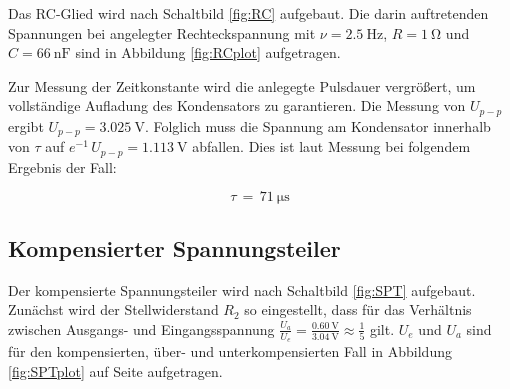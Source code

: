 \documentclass[10pt,a4paper]{scrartcl}
\begin{document}
Das RC-Glied wird nach Schaltbild \ref{fig:RC} aufgebaut.
Die darin auftretenden Spannungen bei angelegter Rechteckspannung mit
$\nu=2.5~\mathrm{Hz}$, $R=1~\mathrm{\Omega}$ und $C=66~\mathrm{nF}$
sind in Abbildung \ref{fig:RCplot} aufgetragen.

Zur Messung der Zeitkonstante wird die anlegegte Pulsdauer vergrößert,
um vollständige Aufladung des Kondensators zu garantieren.
Die Messung von $U_{p-p}$ ergibt $U_{p-p}=3.025~\mathrm V$.
Folglich muss die Spannung am Kondensator innerhalb von $\tau$ auf
$e^{-1}\,U_{p-p}=1.113~\mathrm V$ abfallen.
Dies ist laut Messung bei folgendem Ergebnis der Fall:

\begin{equation*}
    \boxed{\tau\,=\,71~\mathrm{\mu s}}
\end{equation*}

\subsection {Kompensierter Spannungsteiler}

Der kompensierte Spannungsteiler wird nach Schaltbild \ref{fig:SPT} aufgebaut.
Zunächst wird der Stellwiderstand $R_2$ so eingestellt,
dass für das Verhältnis zwischen Ausgangs- und Eingangsspannung
$\frac{U_a}{U_e}=\frac{0.60~\mathrm{V}}{3.04~\mathrm{V}}\approx\frac{1}{5}$
gilt.
$U_e$ und $U_a$ sind für den kompensierten, über- und unterkompensierten Fall
in Abbildung \ref{fig:SPTplot} auf Seite \pageref{fig:SPTplot} aufgetragen.
\end{document}
